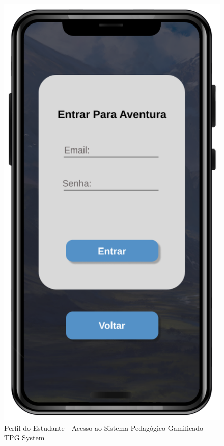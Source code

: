 \begin{figure}[!h]
\centering
\caption{Perfil do Estudante - Acesso ao Sistema Pedagógico Gamificado - TPG System}%
\label{fig:Tela9}
\includegraphics[scale=0.20]{Illustrations/Tela9.png}
\end{figure}

